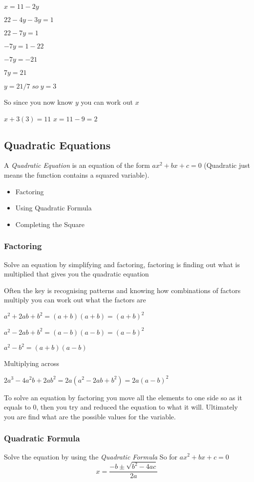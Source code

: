 \documentclass{article}
\begin{document}
$x = 11 -2y$

$22-4y -3y = 1$

$22 - 7y = 1$

$-7y = 1-22$

$-7y = -21$

$7y = 21$

$y =21/7   \;so \;  y = 3$

So since you now know $y$ you can work out $x$

$x + 3 (3) = 11$
$x = 11 -9 = 2$


\subsection{Quadratic Equations}
A \textit{Quadratic Equation} is an equation of the form $ax^{2} + bx + c = 0$ (Quadratic just means the function contains a squared variable).

\begin{itemize}
\item Factoring
\item Using Quadratic Formula
\item Completing the Square
\end{itemize}

\subsubsection{Factoring}
Solve an equation by simplifying and factoring, factoring is finding out what is multiplied that gives you the quadratic equation

Often the key is recognising patterns and knowing how combinations of factors multiply you can work out what the factors are 

$a^{2} + 2ab + b^{2} = (a + b) (a + b)  = (a + b)^{2}$

$a^{2} - 2ab + b^{2} = (a - b) (a - b)  = (a - b)^{2}$

$a^{2} - b^{2} = (a + b) (a - b)$


Multiplying across

$2a^{3} -4a^{2}b + 2ab^{2} = 2a ( a^{2} - 2ab + b^{2} ) = 2a (a-b)^{2}$

To solve an equation by factoring you move all the elements to one side so as it equals to 0,
then you try and reduced the equation to what it will.
Ultimately you are find what are the possible values for the variable.


\subsubsection{Quadratic Formula}
Solve the equation by using the \textit{Quadratic Formula}  
So for $ax^{2} + bx + c = 0$
\begin{equation}
x = \frac{-b \pm \sqrt{b^{2}-4ac}}{2a}
\end{equation}
\end{document}
